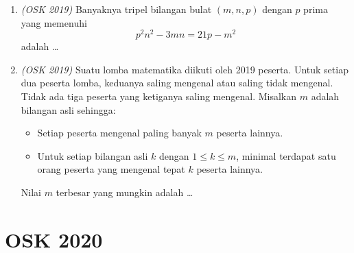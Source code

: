 \documentclass[11pt]{scrartcl}
\begin{document}
\begin{enumerate}
\item \textit{(OSK 2019)} Banyaknya tripel bilangan bulat $(m,n,p)$ dengan $p$ prima yang memenuhi
\[
p^2 n^2 - 3mn = 21p - m^2
\]
adalah \dots

\item \textit{(OSK 2019)} Suatu lomba matematika diikuti oleh 2019 peserta.  
Untuk setiap dua peserta lomba, keduanya saling mengenal atau saling tidak mengenal.  
Tidak ada tiga peserta yang ketiganya saling mengenal.  
Misalkan $m$ adalah bilangan asli sehingga:
\begin{itemize}
    \item Setiap peserta mengenal paling banyak $m$ peserta lainnya.
    \item Untuk setiap bilangan asli $k$ dengan $1 \le k \le m$, minimal terdapat satu orang peserta yang mengenal tepat $k$ peserta lainnya.
\end{itemize}
Nilai $m$ terbesar yang mungkin adalah \dots
\end{enumerate}
\newpage
\section{OSK 2020}
\end{document}
